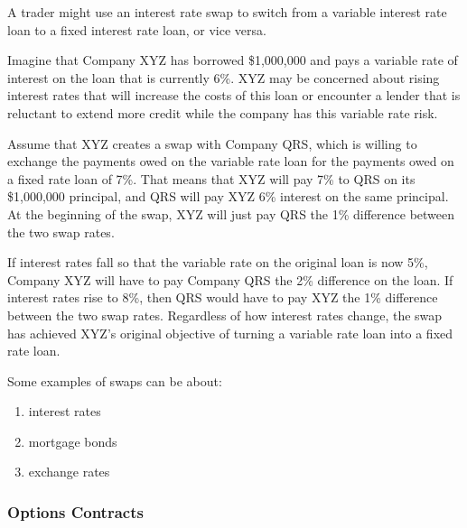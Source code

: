 \documentclass{article}
\begin{document}
      \begin{example}
        A trader might use an interest rate swap to switch from a variable interest rate loan to a fixed interest rate loan, or vice versa. 

        Imagine that Company XYZ has borrowed \$1,000,000 and pays a variable rate of interest on the loan that is currently 6\%. XYZ may be concerned about rising interest rates that will increase the costs of this loan or encounter a lender that is reluctant to extend more credit while the company has this variable rate risk. 

        Assume that XYZ creates a swap with Company QRS, which is willing to exchange the payments owed on the variable rate loan for the payments owed on a fixed rate loan of 7\%. That means that XYZ will pay 7\% to QRS on its \$1,000,000 principal, and QRS will pay XYZ 6\% interest on the same principal. At the beginning of the swap, XYZ will just pay QRS the 1\% difference between the two swap rates.

        If interest rates fall so that the variable rate on the original loan is now 5\%, Company XYZ will have to pay Company QRS the 2\% difference on the loan. If interest rates rise to 8\%, then QRS would have to pay XYZ the 1\% difference between the two swap rates. Regardless of how interest rates change, the swap has achieved XYZ's original objective of turning a variable rate loan into a fixed rate loan.
      \end{example}

      Some examples of swaps can be about: 
      \begin{enumerate}
        \item interest rates
        \item mortgage bonds 
        \item exchange rates
      \end{enumerate}

    \subsubsection{Options Contracts}
\end{document}
